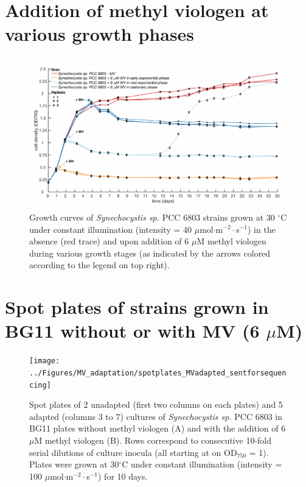 \documentclass[12pt]{article}
\begin{document}
\section{Addition of methyl viologen at various growth phases}

\begin{figure}[H]
    \centering
    \includegraphics[width=\hsize]{../Figures/MV_adaptation/growthcurves_growthstages_Howe.pdf}
    \caption{Growth curves of \textit{Synechocystis sp.} PCC 6803 strains grown at 30 $^\circ$C under constant illumination (intensity = 40 $\mu$mol$\cdot$m$^{-2}\cdot$s$^{-1}$) in the absence (red trace) and upon addition  of 6 $\mu$M  methyl viologen during various growth stages (as indicated by the arrows colored according to the legend on top right).}
    \label{fig:MVgrowthstages}
\end{figure}

\section{Spot plates of strains grown in BG11 without or with MV (6 $\mu$M)}

\begin{figure}[H]
    \centering
    \texttt{[image: ../Figures/MV\_adaptation/spotplates\_MVadapted\_sentforsequencing]}
    \caption{Spot plates of 2 unadapted (first two columns on each plates) and 5 adapted (columns 3 to 7) cultures of \textit{Synechocystis sp.} PCC 6803 in BG11 plates without methyl viologen (A) and with the addition of 6 $\mu$M  methyl viologen (B). Rows correspond to consecutive 10-fold serial dilutions of culture inocula (all starting at on OD$_{750}$ = 1). Plates were grown at 30$^\circ$C under constant illumination (intensity = 100 $\mu$mol$\cdot$m$^{-2}\cdot$s$^{-1}$) for 10 days.}
    \label{fig:spotassayMV}
\end{figure}
\end{document}
